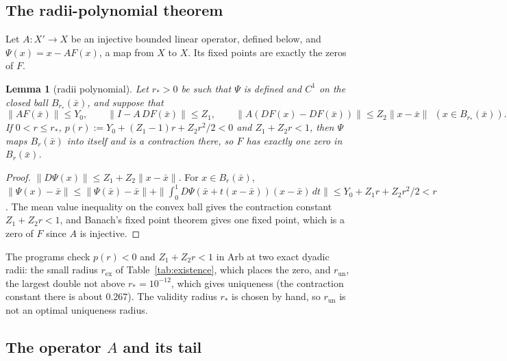 \documentclass[11pt]{article}
\newtheorem{lemma}{Lemma}[section]
\theoremstyle{definition}
\begin{document}
\subsection{The radii-polynomial theorem}\label{sec:rp}

Let $A: X' \to X$ be an injective bounded linear operator, defined below, and $\Psi(x) = x - AF(x)$, a map from $X$ to $X$. Its fixed points are exactly the zeros of $F$.

\begin{lemma}[radii polynomial]\label{lem:rp}
Let $r_* > 0$ be such that $\Psi$ is defined and $C^1$ on the closed ball $B_{r_*}(\bar x)$, and suppose that
\[ \|AF(\bar x)\| \le Y_0, \qquad \|I - A\,DF(\bar x)\| \le Z_1, \qquad \|A(DF(x) - DF(\bar x))\| \le Z_2 \|x - \bar x\| \ \ (x \in B_{r_*}(\bar x)). \]
If $0 < r \le r_*$, $p(r) := Y_0 + (Z_1 - 1)r + Z_2 r^2/2 < 0$ and $Z_1 + Z_2 r < 1$, then $\Psi$ maps $B_r(\bar x)$ into itself and is a contraction there, so $F$ has exactly one zero in $B_r(\bar x)$.
\end{lemma}

\begin{proof}
$\|D\Psi(x)\| \le Z_1 + Z_2\|x - \bar x\|$. For $x \in B_r(\bar x)$, $\|\Psi(x) - \bar x\| \le \|\Psi(\bar x) - \bar x\| + \|\int_0^1 D\Psi(\bar x + t(x - \bar x))(x - \bar x)\,dt\| \le Y_0 + Z_1 r + Z_2 r^2/2 < r$. The mean value inequality on the convex ball gives the contraction constant $Z_1 + Z_2 r < 1$, and Banach's fixed point theorem gives one fixed point, which is a zero of $F$ since $A$ is injective.
\end{proof}

The programs check $p(r) < 0$ and $Z_1 + Z_2 r < 1$ in Arb at two exact dyadic radii: the small radius $r_{\mathrm{ex}}$ of Table~\ref{tab:existence}, which places the zero, and $r_{\mathrm{un}}$, the largest double not above $r_* = 10^{-12}$, which gives uniqueness (the contraction constant there is about $0.267$). The validity radius $r_*$ is chosen by hand, so $r_{\mathrm{un}}$ is not an optimal uniqueness radius.

\subsection{The operator \texorpdfstring{$A$}{A} and its tail}\label{sec:A}
\end{document}
